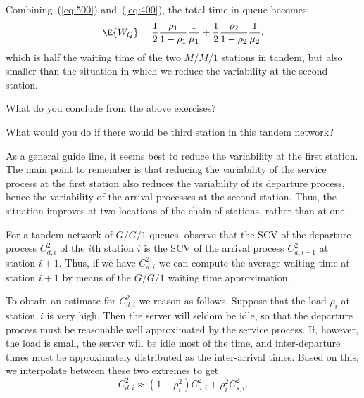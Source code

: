 \begin{exercise}
\begin{solution}
Combining~(\ref{eq:500}) and~(\ref{eq:400}), the total  time in queue
becomes:
\begin{equation*}
  \E{W_Q}= \frac12\frac{\rho_1}{1-\rho_1} \frac1{\mu_1} +
  \frac12\frac{\rho_2}{1-\rho_2} \frac1{\mu_2}, 
\end{equation*}
which is half the waiting time of the two $M/M/1$ stations in tandem, but also smaller than the situation in which we reduce the variability at the second station.
  \end{solution}
\end{exercise}

\begin{exercise}
  What do you conclude from the above exercises?
  \begin{hint}
    What would you do if there would be third station in this tandem network?
  \end{hint}
  \begin{solution}
As a general guide line, it seems best to reduce the
variability at the first station. The main point to remember is that
reducing the variability of the service process at the first station
also reduces the variability of its departure process, hence the
variability of the arrival processes at the second station. Thus, the
situation improves at two locations of the chain of stations, rather
than at one.
  \end{solution}
\end{exercise}

For a tandem network of $G/G/1$ queues, observe that the SCV of the departure process $C_{d,i}^2$ of the $i$th station $i$ is the SCV of the arrival process $C_{a,i+1}^2$ at station $i+1$.  Thus, if we have $C_{d,i}^2$ we can compute the average waiting time at station $i+1$ by means of the $G/G/1$ waiting time approximation. 

To obtain an estimate for $C_{d,i}^2$ we reason as follows. Suppose that the load $\rho_i$ at station~$i$ is very high. Then the server will seldom be idle, so that the departure process must be reasonable well approximated by the service process. If, however, the load is small, the server will be idle most of the time, and inter-departure times must be  approximately distributed as the inter-arrival times. Based on this, we interpolate between these two extremes to get
\begin{equation}
  \label{eq:40}
  C_{d,i}^2 \approx (1-\rho_i^2) C_{a,i}^2 + \rho_i^2 C_{s,i}^2.
\end{equation}


